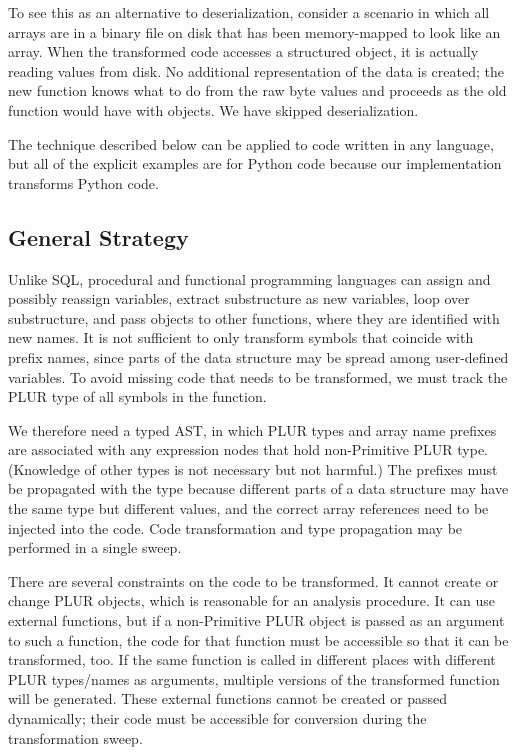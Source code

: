 \documentclass[10pt, conference, compsocconf]{IEEEtran}
\begin{document}
To see this as an alternative to deserialization, consider a scenario in which all arrays are in a binary file on disk that has been memory-mapped to look like an array. When the transformed code accesses a structured object, it is actually reading values from disk. No additional representation of the data is created; the new function knows what to do from the raw byte values and proceeds as the old function would have with objects. We have skipped deserialization.

The technique described below can be applied to code written in any language, but all of the explicit examples are for Python code because our implementation\cite{plur} transforms Python code.

\subsection{General Strategy}

Unlike SQL, procedural and functional programming languages can assign and possibly reassign variables, extract substructure as new variables, loop over substructure, and pass objects to other functions, where they are identified with new names. It is not sufficient to only transform symbols that coincide with prefix names, since parts of the data structure may be spread among user-defined variables. To avoid missing code that needs to be transformed, we must track the PLUR type of all symbols in the function.

We therefore need a typed AST, in which PLUR types and array name prefixes are associated with any expression nodes that hold non-Primitive PLUR type. (Knowledge of other types is not necessary but not harmful.) The prefixes must be propagated with the type because different parts of a data structure may have the same type but different values, and the correct array references need to be injected into the code. Code transformation and type propagation may be performed in a single sweep.

There are several constraints on the code to be transformed. It cannot create or change PLUR objects, which is reasonable for an analysis procedure. It can use external functions, but if a non-Primitive PLUR object is passed as an argument to such a function, the code for that function must be accessible so that it can be transformed, too. If the same function is called in different places with different PLUR types/names as arguments, multiple versions of the transformed function will be generated. These external functions cannot be created or passed dynamically; their code must be accessible for conversion during the transformation sweep.
\end{document}

